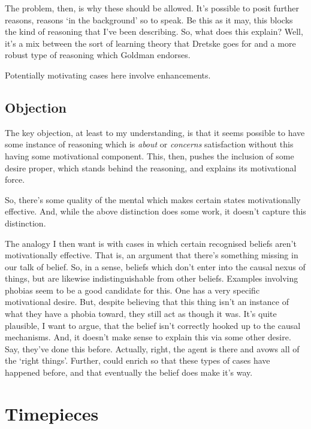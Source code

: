 \documentclass[10pt]{article}
\begin{document}
The problem, then, is why these should be allowed.
It's possible to posit further reasons, reasons `in the background' so to speak.
Be this as it may, this blocks the kind of reasoning that I've been describing.
So, what does this explain?
Well, it's a mix between the sort of learning theory that Dretske goes for and a more robust type of reasoning which Goldman endorses.

Potentially motivating cases here involve enhancements.


\subsection{Objection}
\label{sec:objection}

The key objection, at least to my understanding, is that it seems possible to have some instance of reasoning which is \emph{about} or \emph{concerns} satisfaction without this having some motivational component.
This, then, pushes the inclusion of some desire proper, which stands behind the reasoning, and explains its motivational force.

So, there's some quality of the mental which makes certain states motivationally effective.
And, while the above distinction does some work, it doesn't capture this distinction.

The analogy I then want is with cases in which certain recognised beliefs aren't motivationally effective.
That is, an argument that there's something missing in our talk of belief.
So, in a sense, beliefs which don't enter into the causal nexus of things, but are likewise indistinguishable from other beliefs.
Examples involving phobias seem to be a good candidate for this.
One has a very specific motivational desire.
But, despite believing that this thing isn't an instance of what they have a phobia toward, they still act as though it was.
It's quite plausible, I want to argue, that the belief isn't correctly hooked up to the causal mechanisms.
And, it doesn't make sense to explain this via some other desire.
Say, they've done this before.
Actually, right, the agent is there and avows all of the `right things'.
Further, could enrich so that these types of cases have happened before, and that eventually the belief does make it's way.




\section{Timepieces}
\label{sec:timepieces}
\end{document}

